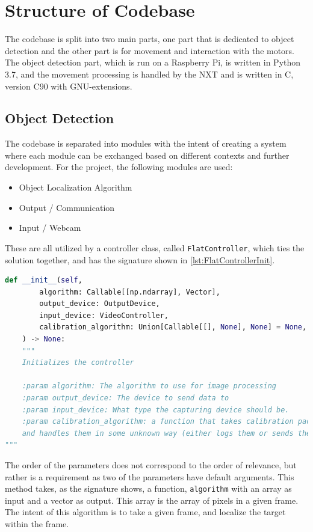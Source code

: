 \section{Structure of Codebase}
The codebase is split into two main parts, one part that is dedicated to object detection and the other part is for movement and interaction with the motors.
The object detection part, which is run on a Raspberry Pi, is written in Python 3{.}7, and the movement processing is handled by the NXT and is written in C, version C90 with GNU-extensions.


\subsection{Object Detection}
The codebase is separated into modules with the intent of creating a system where each module can be exchanged based on different contexts and further development.
For the project, the following modules are used:
\begin{itemize}
	\item Object Localization Algorithm
	\item Output / Communication
	\item Input / Webcam
\end{itemize}

These are all utilized by a controller class, called \texttt{FlatController}, which ties the solution together, and has the signature shown in \autoref{lst:FlatControllerInit}.
\begin{lstlisting}[language=Python,label={lst:FlatControllerInit},caption={Initialization method of the \texttt{FlatController} class}]
def __init__(self,
		algorithm: Callable[[np.ndarray], Vector],
		output_device: OutputDevice,
		input_device: VideoController,
		calibration_algorithm: Union[Callable[[], None], None] = None,
	) -> None:
	"""
	Initializes the controller
	
	:param algorithm: The algorithm to use for image processing
	:param output_device: The device to send data to
	:param input_device: What type the capturing device should be.
	:param calibration_algorithm: a function that takes calibration packages,
	and handles them in some unknown way (either logs them or sends them back)
"""

\end{lstlisting}

The order of the parameters does not correspond to the order of relevance, but rather is a requirement as two of the parameters have default arguments.
This method takes, as the signature shows, a function, \texttt{algorithm} with an array as input and a vector as output.
This array is the array of pixels in a given frame.
The intent of this algorithm is to take a given frame, and localize the target within the frame.


